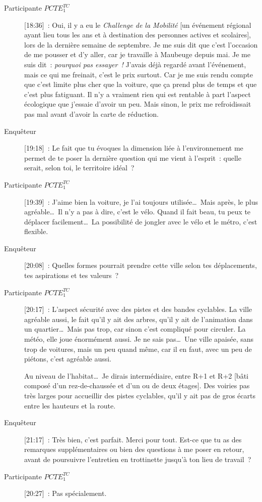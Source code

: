 \begin{description}
    \item[Participante \(PCTE^{TC}_{1}\)] [18:36]~: Oui, il y a eu le \textsl{Challenge de la Mobilité} [un événement régional ayant lieu tous les ans et à destination des personnes actives et scolaires], lors de la dernière semaine de septembre. Je me suis dit que c’est l’occasion de me pousser et d’y aller, car je travaille à Maubeuge depuis mai. Je me suis dit~: \textsl{pourquoi pas essayer~!} J’avais déjà regardé avant l’événement, mais ce qui me freinait, c’est le prix surtout. Car je me suis rendu compte que c’est limite plus cher que la voiture, que ça prend plus de temps et que c’est plus fatiguant. Il n’y a vraiment rien qui est rentable à part l’aspect écologique que j’essaie d’avoir un peu. Mais sinon, le prix me refroidissait pas mal avant d’avoir la carte de réduction.
    \item[Enquêteur] [19:18]~: Le fait que tu évoques la dimension liée à l'environnement me permet de te poser la dernière question qui me vient à l'esprit~: quelle serait, selon toi, le territoire idéal~?
    \item[Participante \(PCTE^{TC}_{1}\)] [19:39]~: J’aime bien la voiture, je l’ai toujours utilisée\dots~Mais après, le plus agréable\dots~Il n’y a pas à dire, c’est le vélo. Quand il fait beau, tu peux te déplacer facilement\dots~La possibilité de jongler avec le vélo et le métro, c'est flexible.
    \item[Enquêteur] [20:08]~: Quelles formes pourrait prendre cette ville selon tes déplacements, tes aspirations et tes valeurs~?
    \item[Participante \(PCTE^{TC}_{1}\)] [20:17]~: L’aspect sécurité avec des pistes et des bandes cyclables. La ville agréable aussi, le fait qu’il y ait des arbres, qu’il y ait de l’animation dans un quartier\dots~Mais pas trop, car sinon c’est compliqué pour circuler. La météo, elle joue énormément aussi. Je ne sais pas\dots~Une ville apaisée, sans trop de voitures, mais un peu quand même, car il en faut, avec un peu de piétons, c’est agréable aussi.%

    Au niveau de l'habitat\dots~Je dirais intermédiaire, entre R+1 et R+2 [bâti composé d'un rez-de-chaussée et d'un ou de deux étages]. Des voiries pas très larges pour accueillir des pistes cyclables, qu'il y ait pas de gros écarts entre les hauteurs et la route.
    \item[Enquêteur] [21:17]~: Très bien, c'est parfait. Merci pour tout. Est-ce que tu as des remarques supplémentaires ou bien des questions à me poser en retour, avant de poursuivre l'entretien en trottinette jusqu'à ton lieu de travail~?
    \item[Participante \(PCTE^{TC}_{1}\)] [20:27]~: Pas spécialement.
\end{description}%

